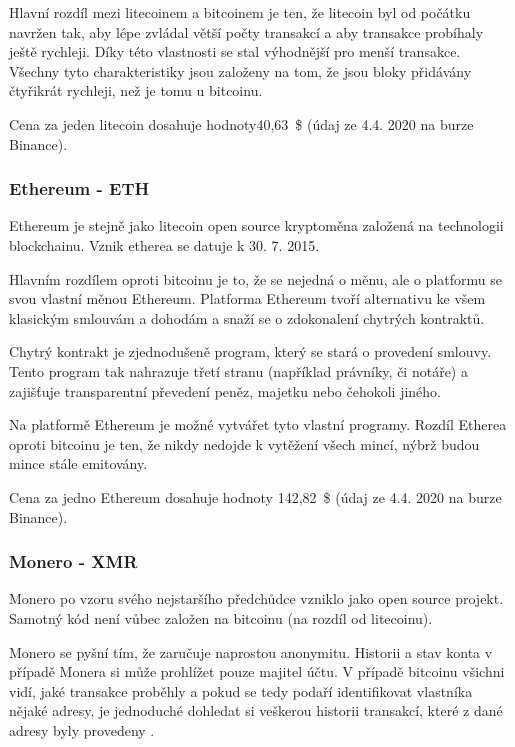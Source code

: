 \documentclass[thesis=B,czech]{FITthesis}[2019/03/21]
\begin{document}
Hlavní rozdíl mezi litecoinem a bitcoinem je ten, že litecoin byl od počátku navržen tak, aby lépe zvládal větší počty transakcí a aby transakce probíhaly ještě rychleji. Díky této vlastnosti se stal výhodnější pro menší transakce. Všechny tyto charakteristiky jsou založeny na tom, že jsou bloky přidávány čtyřikrát rychleji, než je tomu u bitcoinu. \cite{litecoin}

Cena za jeden litecoin dosahuje hodnoty40,63~\$ (údaj ze 4.4. 2020 na burze Binance). \cite{binance_markets}

\subsubsection{Ethereum - ETH}
Ethereum je stejně jako litecoin open source kryptoměna založená na technologii blockchainu. Vznik etherea se datuje k 30. 7. 2015. 

Hlavním rozdílem oproti bitcoinu je to, že se nejedná o měnu, ale o platformu se svou vlastní měnou Ethereum. Platforma Ethereum tvoří alternativu ke všem klasickým smlouvám a dohodám a snaží se o zdokonalení chytrých kontraktů. \cite{btc_vs_eth}

Chytrý kontrakt je zjednodušeně program, který se stará o provedení smlouvy. Tento program tak nahrazuje třetí stranu (například právníky, či notáře) a zajišťuje transparentní převedení peněz, majetku nebo čehokoli jiného. \cite{ethereum}

Na platformě Ethereum je možné vytvářet tyto vlastní programy. \cite{ethereum} Rozdíl Etherea oproti bitcoinu je ten, že nikdy nedojde k vytěžení všech mincí, nýbrž budou mince stále emitovány. \cite{alza_monero}

Cena za jedno Ethereum dosahuje hodnoty 142,82~\$ (údaj ze 4.4. 2020 na burze Binance). \cite{binance_markets}

\subsubsection{Monero - XMR}
Monero po vzoru svého nejstaršího předchůdce vzniklo jako open source projekt. Samotný kód není vůbec založen na bitcoinu (na rozdíl od litecoinu). 

Monero se pyšní tím, že zaručuje naprostou anonymitu. Historii a stav konta v případě Monera si může prohlížet pouze majitel účtu. V případě bitcoinu všichni vidí, jaké transakce proběhly a pokud se tedy podaří identifikovat vlastníka nějaké adresy, je jednoduché dohledat si veškerou historii transakcí, které z dané adresy byly provedeny .
\end{document}

